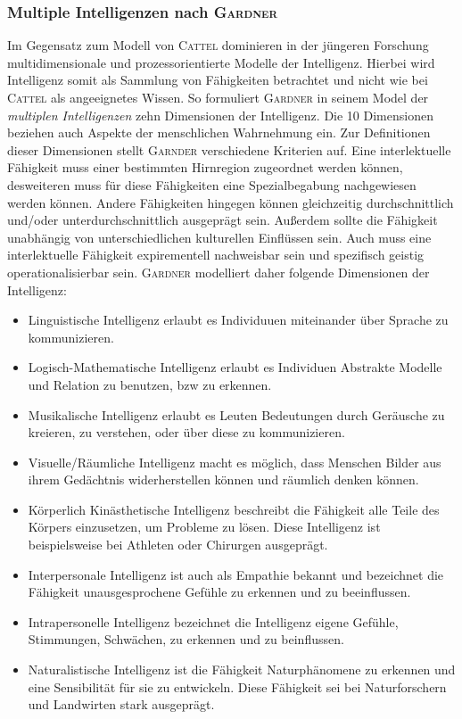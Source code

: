 \documentclass[a4paper, 11pt]{scrartcl}
\begin{document}
\subsubsection{Multiple Intelligenzen nach \textsc{Gardner}}
Im Gegensatz zum Modell von \textsc{Cattel} dominieren in der jüngeren Forschung multidimensionale und prozessorientierte Modelle der Intelligenz. Hierbei wird Intelligenz somit als Sammlung von Fähigkeiten betrachtet und nicht wie bei \textsc{Cattel} als angeeignetes Wissen. So formuliert \textsc{Gardner} in seinem Model der \textit{multiplen Intelligenzen} zehn Dimensionen der Intelligenz. Die 10 Dimensionen beziehen auch Aspekte der menschlichen Wahrnehmung ein. Zur Definitionen dieser Dimensionen stellt \textsc{Garnder} verschiedene Kriterien auf. Eine interlektuelle Fähigkeit muss einer bestimmten Hirnregion zugeordnet werden können, desweiteren muss für diese Fähigkeiten eine Spezialbegabung nachgewiesen werden können. Andere Fähigkeiten hingegen können gleichzeitig durchschnittlich und/oder unterdurchschnittlich ausgeprägt sein. Außerdem sollte die Fähigkeit unabhängig von unterschiedlichen kulturellen Einflüssen sein. Auch muss eine interlektuelle Fähigkeit expirementell nachweisbar sein und spezifisch geistig operationalisierbar sein. \textsc{Gardner} modelliert daher folgende Dimensionen der Intelligenz:
\begin{itemize}
  \item Linguistische Intelligenz erlaubt es Individuuen miteinander über Sprache zu kommunizieren.
  \item Logisch-Mathematische Intelligenz erlaubt es Individuen Abstrakte Modelle und Relation zu benutzen, bzw zu erkennen.
  \item Musikalische Intelligenz erlaubt es Leuten Bedeutungen durch Geräusche zu kreieren, zu verstehen, oder über diese zu kommunizieren.
  \item Visuelle/Räumliche Intelligenz macht es möglich, dass Menschen Bilder aus ihrem Gedächtnis widerherstellen können und räumlich denken können.
  \item Körperlich Kinästhetische Intelligenz beschreibt die Fähigkeit alle Teile des Körpers einzusetzen, um Probleme zu lösen. Diese Intelligenz ist beispielsweise bei Athleten oder Chirurgen ausgeprägt.
  \item Interpersonale Intelligenz ist auch als Empathie bekannt und bezeichnet die Fähigkeit unausgesprochene Gefühle zu erkennen und zu beeinflussen.
  \item Intrapersonelle Intelligenz bezeichnet die Intelligenz eigene Gefühle, Stimmungen, Schwächen, zu erkennen und zu beinflussen.
  \item Naturalistische Intelligenz ist die Fähigkeit Naturphänomene zu erkennen und eine Sensibilität für sie zu entwickeln. Diese Fähigkeit sei bei Naturforschern und Landwirten stark ausgeprägt.
\end{itemize}
\end{document}
